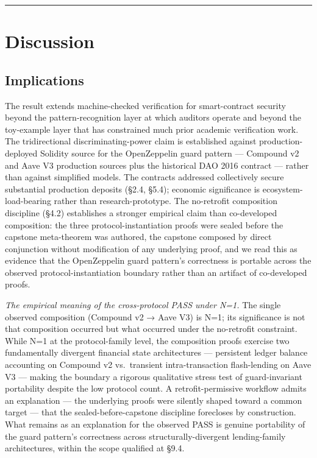 \begin{center}\rule{0.5\linewidth}{0.5pt}\end{center}

\section{Discussion}\label{discussion}

\subsection{Implications}\label{implications}

The result extends machine-checked verification for smart-contract
security beyond the pattern-recognition layer at which auditors operate
and beyond the toy-example layer that has constrained much prior
academic verification work. The tridirectional discriminating-power
claim is established against production-deployed Solidity source for the
OpenZeppelin guard pattern --- Compound v2 and Aave V3 production
sources plus the historical DAO 2016 contract --- rather than against
simplified models. The contracts addressed collectively secure
substantial production deposits (§2.4, §5.4); economic significance is
ecosystem-load-bearing rather than research-prototype. The no-retrofit
composition discipline (§4.2) establishes a stronger empirical claim
than co-developed composition: the three protocol-instantiation proofs
were sealed before the capstone meta-theorem was authored, the capstone
composed by direct conjunction without modification of any underlying
proof, and we read this as evidence that the OpenZeppelin guard
pattern's correctness is portable across the observed
protocol-instantiation boundary rather than an artifact of co-developed
proofs.

\emph{The empirical meaning of the cross-protocol PASS under N=1.} The
single observed composition (Compound v2 → Aave V3) is N=1; its
significance is not that composition occurred but what occurred under
the no-retrofit constraint. While N=1 at the protocol-family level, the
composition proofs exercise two fundamentally divergent financial state
architectures --- persistent ledger balance accounting on Compound v2
vs.~transient intra-transaction flash-lending on Aave V3 --- making the
boundary a rigorous qualitative stress test of guard-invariant
portability despite the low protocol count. A retrofit-permissive
workflow admits an explanation --- the underlying proofs were silently
shaped toward a common target --- that the sealed-before-capstone
discipline forecloses by construction. What remains as an explanation
for the observed PASS is genuine portability of the guard pattern's
correctness across structurally-divergent lending-family architectures,
within the scope qualified at §9.4.

